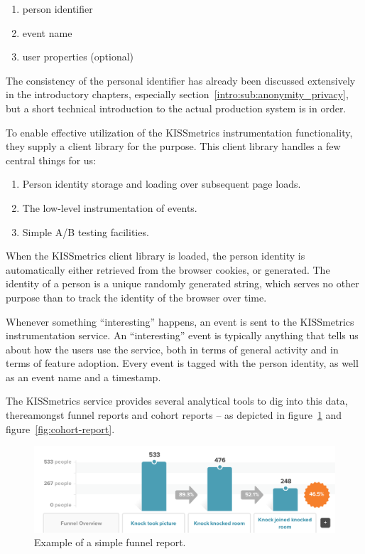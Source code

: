 \begin{enumerate}
  \item person identifier
  \item event name
  \item user properties (optional)
\end{enumerate}

The consistency of the personal identifier has already been discussed extensively in the introductory chapters, especially section~\ref{intro:sub:anonymity_privacy}, but a short technical introduction to the actual production system is in order.

To enable effective utilization of the KISSmetrics instrumentation functionality, they supply a client library for the purpose. This client library handles a few central things for us:

\begin{enumerate}
  \item Person identity storage and loading over subsequent page loads.
  \item The low-level instrumentation of events.
  \item Simple A/B testing facilities.
\end{enumerate}

When the KISSmetrics client library is loaded, the person identity is automatically either retrieved from the browser cookies, or generated. The identity of a person is a unique randomly generated string, which serves no other purpose than to track the identity of the browser over time.

Whenever something ``interesting'' happens, an event is sent to the KISSmetrics instrumentation service. An ``interesting'' event is typically anything that tells us about how the users use the service, both in terms of general activity and in terms of feature adoption. Every event is tagged with the person identity, as well as an event name and a timestamp.

The KISSmetrics service provides several analytical tools to dig into this data, thereamongst funnel reports and cohort reports -- as depicted in figure~\ref{fig:funnel-report} and figure~\ref{fig:cohort-report}.

\begin{figure}[h]
  \centering
    \includegraphics[width=\textwidth]{Figures/screenshots/km/funnel-example}
    \caption{Example of a simple funnel report.}
    \label{fig:funnel-report}
\end{figure}

